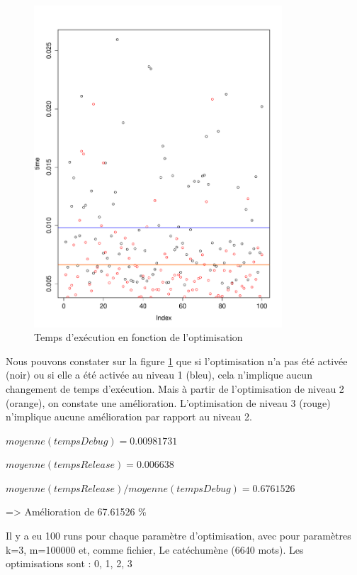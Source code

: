 \begin{figure}[H]
	\begin{center}
		\includegraphics[height=12cm]{diagrams/time_optimisation.pdf}
		\caption{Temps d'exécution en fonction de l'optimisation}
		\label{fig:timeOptimisation}
	\end{center}
\end{figure}

Nous pouvons constater sur la figure \ref{fig:timeOptimisation} que si l'optimisation n'a pas été activée (noir) ou si elle a été activée au niveau 1 (bleu), cela n'implique aucun changement de temps d'exécution. Mais à partir de l'optimisation de niveau 2 (orange), on constate une amélioration. L'optimisation de niveau 3 (rouge) n'implique aucune amélioration par rapport au niveau 2.


$moyenne(tempsDebug) = 0.00981731$
\par
$moyenne(tempsRelease) = 0.006638$
\par
$moyenne(tempsRelease) / moyenne(tempsDebug) = 0.6761526$
\par => Amélioration de 67.61526 \%

Il y a eu 100 runs pour chaque paramètre d'optimisation, avec pour paramètres k=3, m=100000 et, comme fichier, Le catéchumène (6640 mots).
Les optimisations sont : 0, 1, 2, 3


